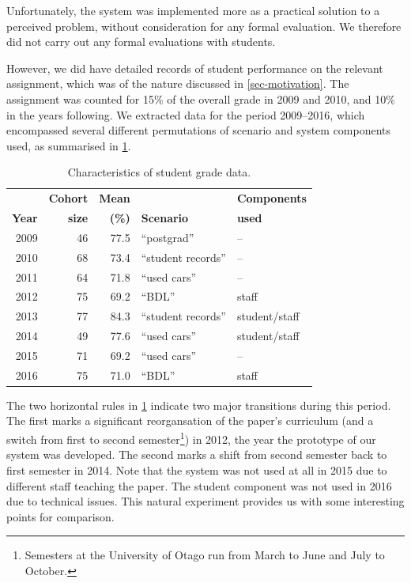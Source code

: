 \documentclass[sigconf, authordraft, capitalise]{acmart}
\begin{document}
Unfortunately, the system was implemented more as a practical solution to a perceived problem, without consideration for any formal evaluation. We therefore did not carry out any formal evaluations with students.

However, we did have detailed records of student performance on the relevant assignment, which was of the nature discussed in \cref{sec-motivation}. The assignment was counted for 15\% of the overall grade in 2009 and 2010, and 10\% in the years following.  We extracted data for the period 2009--2016, which encompassed several different permutations of scenario and system components used, as summarised in \cref{tab-data}.

\begin{table}
    \begin{tabular}{rrrll}
        \toprule
                        &   \textbf{Cohort} &   \textbf{Mean}   &                       &   \textbf{Components}  \\
        \textbf{Year}   &   \textbf{size}   &   \textbf{(\%)}   &   \textbf{Scenario}   &   \textbf{used}\\
        \midrule
        2009    &   46  &   77.5    &   ``postgrad''        &   --  \\
        2010    &   68  &   73.4    &   ``student records'' &   --  \\
        2011    &   64  &   71.8    &   ``used cars''       &   --  \\
        \midrule
        2012    &   75  &   69.2    &   ``BDL''             &   staff   \\
        2013    &   77  &   84.3    &   ``student records'' &   student/staff \\
        \midrule
        2014    &   49  &   77.6    &   ``used cars''       &   student/staff \\
        2015    &   71  &   69.2    &   ``used cars''       &   --  \\
        2016    &   75  &   71.0    &   ``BDL''             &   staff   \\
        \bottomrule
    \end{tabular}
    \caption{Characteristics of student grade data.}
    \label{tab-data}
\end{table}

The two horizontal rules in \cref{tab-data} indicate two major transitions during this period. The first marks a significant reorgansation of the paper's curriculum (and a switch from first to second semester\footnote{Semesters at the University of Otago run from March to June and July to October.}) in 2012, the year the prototype of our system was developed. The second marks a shift from second semester back to first semester in 2014. Note that the system was not used at all in 2015 due to different staff teaching the paper. The student component was not used in 2016 due to technical issues. This natural experiment provides us with some interesting points for comparison.
\end{document}
